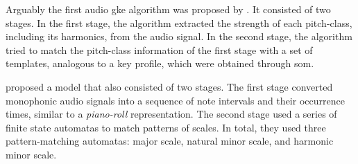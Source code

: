 



Arguably the first audio \gls{gke} algorithm was proposed by
\textcite{leman1992een}. It consisted of two stages. In the
first stage, the algorithm extracted the strength of each
pitch-class, including its harmonics, from the audio signal.
In the second stage, the algorithm tried to match the
pitch-class information of the first stage with a set of
templates, analogous to a key profile, which were obtained
through \acrfull{som}.


\textcite{izmirli1994recognition} proposed a model that also
consisted of two stages. The first stage converted
monophonic audio signals into a sequence of note intervals
and their occurrence times, similar to a \emph{piano-roll}
representation. The second stage used a series of finite
state automatas to match patterns of scales. In total, they
used three pattern-matching automatas: major scale, natural
minor scale, and harmonic minor scale.

